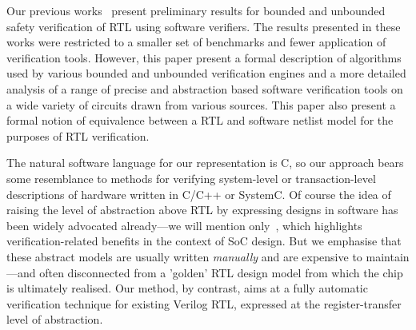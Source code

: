 Our previous works~\cite{mkm2015,mskm2016,mtk2016} present preliminary results 
for bounded and unbounded safety verification of RTL using software verifiers.  
The results presented in these works were restricted to a smaller set of 
benchmarks and fewer application of verification tools.  However, this paper 
present a formal description of algorithms used by various bounded and unbounded 
verification engines and a more detailed analysis of a range of precise and 
abstraction based software verification tools on a wide variety of circuits 
drawn from various sources.  This paper also present a formal notion 
of equivalence between a RTL and software netlist model for the purposes 
of RTL verification. 


The natural software language for our representation is C, so
our approach bears some resemblance to methods for verifying system-level or
transaction-level descriptions of hardware written in C/C++ or SystemC.  Of
course the idea of raising the level of abstraction above RTL by expressing designs in software
has been
widely advocated already---we will mention only~\cite{soc-keating}, which
highlights verification-related benefits in the context of SoC design.  But we
emphasise that these abstract models are usually written \emph{manually} and are 
expensive to maintain---and often disconnected from a 'golden' RTL design model from
which the chip is ultimately realised.  Our method, by contrast, 
aims at a fully automatic verification technique for existing Verilog RTL, expressed at
the register-transfer level of abstraction.



